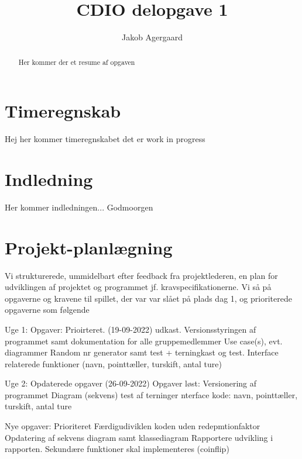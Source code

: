 \documentclass{article}
\title{CDIO delopgave 1}
\author{Jakob Agergaard}
\begin{document}


\normalsize
\begin{abstract}
     Her kommer der et resume af opgaven
\end{abstract}

\tableofcontents

\section{Timeregnskab}
Hej her kommer timeregnskabet det er work in progress

\section{Indledning}

Her kommer indledningen...
Godmoorgen

\section{Projekt-planlægning}
\item Vi strukturerede, ummidelbart efter feedback fra projektlederen, en plan for udviklingen af projektet og programmet jf. kravspecifikationerne. Vi så på opgaverne og kravene til spillet, der var var slået på plads dag 1, og prioriterede opgaverne som følgende
 \item Uge 1:
 Opgaver:
Prioirteret. (19-09-2022) udkast.
Versionsstyringen af programmet samt dokumentation for alle gruppemedlemmer
Use case(s), evt. diagrammer
Random nr generator samt test + terningkast og test.
Interface relaterede funktioner (navn, pointtæller, turskift, antal ture)
\item Uge 2:
Opdaterede opgaver (26-09-2022)
Opgaver løst:
Versionering af programmet
Diagram (sekvens)
test af terninger
nterface kode: navn, pointtæller, turskift, antal ture

\item Nye opgaver:
Prioriteret
Færdigudiviklen koden uden redepmtionfaktor
Opdatering af sekvens diagram samt klassediagram
Rapportere udvikling i rapporten.
Sekundære funktioner skal implementeres (coinflip)

 
\end{document}
